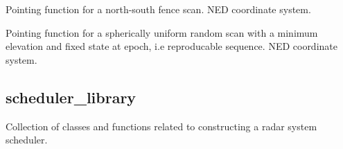 \documentclass[letterpaper,10pt,english]{sphinxmanual}
\begin{document}

\begin{fulllineitems}
\label{\detokenize{modules/radar_scan_library:radar_scan_library.point_ns_fence_scan}}
Pointing function for a north-south fence scan. NED coordinate system.

\end{fulllineitems}


\begin{fulllineitems}
\label{\detokenize{modules/radar_scan_library:radar_scan_library.point_sph_rng_scan}}
Pointing function for a spherically uniform random scan with a minimum elevation and fixed state at epoch, i.e reproducable sequence. NED coordinate system.

\end{fulllineitems}


\begin{fulllineitems}
\label{\detokenize{modules/radar_scan_library:radar_scan_library.sph_rng_model}}
\end{fulllineitems}



\subsection{scheduler\_library}
\label{\detokenize{modules/scheduler_library:module-scheduler_library}}\label{\detokenize{modules/scheduler_library:scheduler-library}}\label{\detokenize{modules/scheduler_library::doc}}
Collection of classes and functions related to constructing a radar system scheduler.
\end{document}

